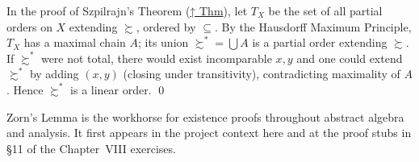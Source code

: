 \begin{remark*}
In the proof of Szpilrajn's Theorem (\hyperref[thm:szpilrajn]{↑ Thm}), let
$T_X$ be the set of all partial orders on $X$ extending $\succsim$, ordered
by $\subseteq$. By the Hausdorff Maximum Principle, $T_X$ has a maximal chain
$A$; its union $\succsim^* = \bigcup A$ is a partial order extending
$\succsim$. If $\succsim^*$ were not total, there would exist incomparable
$x, y$ and one could extend $\succsim^*$ by adding $(x,y)$ (closing under
transitivity), contradicting maximality of $A$. Hence $\succsim^*$ is a
linear order. \qed
\end{remark*}

\begin{remark*}[Transition]
Zorn's Lemma is the workhorse for existence proofs throughout abstract
algebra and analysis. It first appears in the project context here and at
the proof stubs in \S11 of the Chapter~VIII exercises.
\end{remark*}
